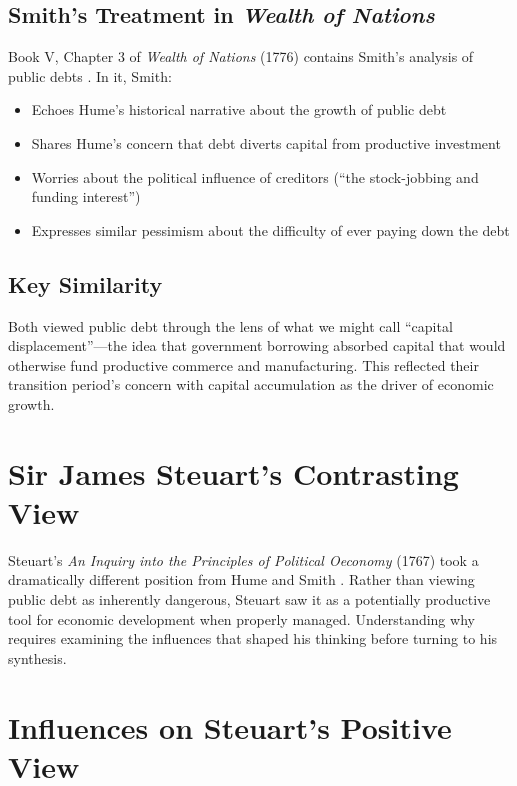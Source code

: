 \documentclass[12pt]{article}
\begin{document}
\subsection{Smith's Treatment in \textit{Wealth of Nations}}

Book V, Chapter 3 of \textit{Wealth of Nations} (1776) contains Smith's analysis of public debts \citep{smith1776}. In it, Smith:

\begin{itemize}
\item Echoes Hume's historical narrative about the growth of public debt
\item Shares Hume's concern that debt diverts capital from productive investment
\item Worries about the political influence of creditors (``the stock-jobbing and funding interest'')
\item Expresses similar pessimism about the difficulty of ever paying down the debt
\end{itemize}

\subsection{Key Similarity}

Both viewed public debt through the lens of what we might call ``capital displacement''---the idea that government borrowing absorbed capital that would otherwise fund productive commerce and manufacturing. This reflected their transition period's concern with capital accumulation as the driver of economic growth.

\section{Sir James Steuart's Contrasting View}

Steuart's \textit{An Inquiry into the Principles of Political Oeconomy} (1767) took a dramatically different position from Hume and Smith \citep{steuart1767}. Rather than viewing public debt as inherently dangerous, Steuart saw it as a potentially productive tool for economic development when properly managed. Understanding why requires examining the influences that shaped his thinking before turning to his synthesis.

\section{Influences on Steuart's Positive View}
\end{document}
